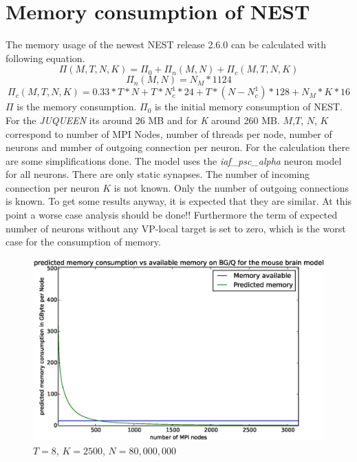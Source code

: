 \documentclass[a4paper]{article}
\begin{document}
\section{Memory consumption of NEST}
The memory usage of the newest NEST release 2.6.0 can be calculated with following equation. \cite{kunkel2014spiking}
\begin{equation}
  \Pi(M,T,N,K) =  \Pi_0 + \Pi_n(M,N)  + \Pi_c(M,T,N,K)
  \label{eq:NESTmemconsumption}
\end{equation} 
\begin{equation}
  \Pi_n(M,N) = N_M*1124
\end{equation}
\begin{equation}
  \Pi_c(M,T,N,K) = 0.33 * T * N + T * N^1_c * 24 + T*(N-N^1_c)*128 + N_M*K*16
\end{equation}
$\Pi$ is the memory consumption. $\Pi_0$ is the initial memory consumption of NEST.
For the \emph{JUQUEEN} its around 26 MB and for \emph{K} around 260 MB.
$M$,$T$, $N$, $K$ correspond to number of MPI Nodes, number of threads per node, number of neurons and number of outgoing connection per neuron.
For the calculation there are some simplifications done.
The model uses the \emph{iaf\_psc\_alpha} neuron model for all neurons. There are only static synapses.
The number of incoming connection per neuron $K$ is not known. Only the number of outgoing connections is known.
To get some results anyway, it is expected that they are similar. At this point a worse case analysis should be done!!
Furthermore the term of expected number of neurons without any VP-local target is set to zero, which is the worst case for the consumption of memory.
\begin{figure}[h]
\centering
\includegraphics[scale=0.5]{predicted_mem_NEST.eps}
	\caption{$T=8$, $K=2500$, $N=80,000,000$}
	\label{Mikesformatcon}
\end{figure}
\end{document}
